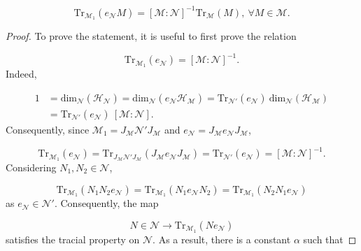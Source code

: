 \documentclass[10pt,a4paper]{amsart}
\begin{document}
\begin{Proposition}
    \begin{equation}
        \mathrm{Tr}_{\mathcal{M}_1}(e_{\mathcal{N}} M) = [\mathcal{M} : \mathcal{N}]^{-1} \mathrm{Tr}_{\mathcal{M}}(M), \ \forall M \in \mathcal{M} \text{.}
    \end{equation}
\end{Proposition}

\begin{proof}
    To prove the statement, it is useful to first prove the relation

    \begin{equation}
        \mathrm{Tr}_{\mathcal{M}_1}(e_{\mathcal{N}}) = [\mathcal{M} : \mathcal{N}]^{-1} \text{.}
    \end{equation}
    Indeed,

    \begin{equation}
        \begin{split}
            1 &= \mathrm{dim}_{\mathcal{N}}(\mathcal{H}_{\mathcal{N}}) = \mathrm{dim}_{\mathcal{N}}(e_{\mathcal{N}} \mathcal{H}_{\mathcal{M}}) = \mathrm{Tr}_{\mathcal{N}'}(e_{\mathcal{N}}) \ \mathrm{dim}_{\mathcal{N}}(\mathcal{H}_{\mathcal{M}}) \\
            &= \mathrm{Tr}_{\mathcal{N}'}(e_{\mathcal{N}}) \ [\mathcal{M} : \mathcal{N}] \text{.}
        \end{split}
    \end{equation}
    Consequently, since $\mathcal{M}_1 = J_{\mathcal{M}} \mathcal{N}' J_{\mathcal{M}}$ and $e_{\mathcal{N}} = J_{\mathcal{M}} e_{\mathcal{N}} J_{\mathcal{M}}$,

    \begin{equation}
        \mathrm{Tr}_{\mathcal{M}_1}(e_{\mathcal{N}}) = \mathrm{Tr}_{J_{\mathcal{M}} \mathcal{N}' J_{\mathcal{M}}} (J_{\mathcal{M}} e_{\mathcal{N}} J_{\mathcal{M}}) = \mathrm{Tr}_{\mathcal{N}'} (e_{\mathcal{N}}) = [\mathcal{M} : \mathcal{N}]^{-1} \text{.}
    \end{equation}
    Considering $N_1, N_2 \in \mathcal{N}$,

    \begin{equation}
        \mathrm{Tr}_{\mathcal{M}_1}(N_1 N_2 e_{\mathcal{N}}) = \mathrm{Tr}_{\mathcal{M}_1}(N_1 e_{\mathcal{N}} N_2) = \mathrm{Tr}_{\mathcal{M}_1}(N_2 N_1 e_{\mathcal{N}})
    \end{equation}
    as $e_{\mathcal{N}} \in \mathcal{N}'$. Consequently, the map

    \begin{equation}
        N \in \mathcal{N} \rightarrow \mathrm{Tr}_{\mathcal{M}_1}(N e_{\mathcal{N}})
    \end{equation}
    satisfies the tracial property on $\mathcal{N}$. As a result, there is a constant $\alpha$ such that


\end{proof}
\end{document}
